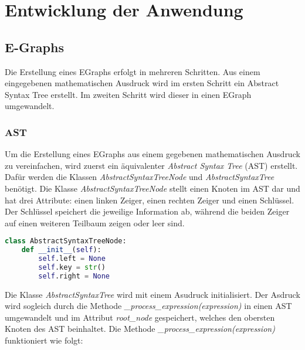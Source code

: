 \section{Entwicklung der Anwendung}\label{sec:entwicklung}

\subsection{E-Graphs}

Die Erstellung eines EGraphs erfolgt in mehreren Schritten. Aus einem eingegebenen mathematischen Ausdruck wird im ersten Schritt ein Abstract Syntax Tree erstellt.
Im zweiten Schritt wird dieser in einen EGraph umgewandelt.

\subsubsection{AST}

Um die Erstellung eines EGraphs aus einem gegebenen mathematischen Ausdruck zu vereinfachen, wird zuerst ein äquivalenter \textit{Abstract Syntax Tree} (AST)
erstellt. Dafür werden die Klassen \textit{AbstractSyntaxTreeNode} und \textit{AbstractSyntaxTree} benötigt.
Die Klasse \textit{AbstractSyntaxTreeNode} stellt einen Knoten im AST dar und hat drei Attribute: einen linken Zeiger, einen rechten Zeiger und einen Schlüssel.
Der Schlüssel speichert die jeweilige Information ab, während die beiden Zeiger auf einen weiteren Teilbaum zeigen oder leer sind.

\begin{lstlisting}[language=Python, caption=Klasse \textit{AbstractSyntaxTreeNode}]
class AbstractSyntaxTreeNode:
    def __init__(self):
        self.left = None
        self.key = str()
        self.right = None
\end{lstlisting}


Die Klasse \textit{AbstractSyntaxTree} wird mit einem Asudruck initialisiert. Der Asdruck wird sogleich durch die Methode \textit{\_process\_expression(expression)}
in einen AST umgewandelt und im Attribut \textit{root\_node} gespeichert, welches den obersten Knoten des AST beinhaltet.
Die Methode \textit{\_process\_expression(expression)} funktioniert wie folgt:

